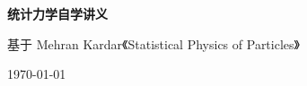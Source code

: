 \documentclass[11pt,a4paper,oneside,fontset=fandol]{ctexbook}
\begin{document}

\begin{titlepage}
  \centering
  \vspace*{4.5cm}
  {\Huge\bfseries 统计力学自学讲义\par}
  \vspace{1.5cm}
  {\large 基于 Mehran Kardar《Statistical Physics of Particles》\par}
  \vspace{3cm}
  {\large \today\par}
\end{titlepage}

\begin{cnabstract}
  \vspace{10\baselineskip}
\end{cnabstract}

\tableofcontents

\clearpage
{}









\appendix


\end{document}
